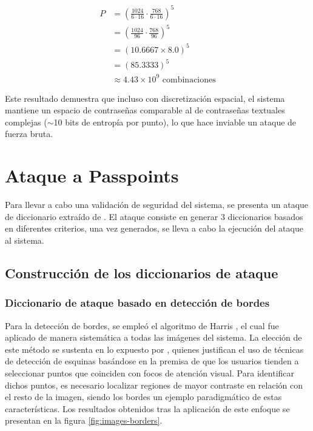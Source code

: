 \begin{align*}
	P &= \left( \frac{1024}{6 \cdot 16} \cdot \frac{768}{6 \cdot 16} \right)^5 \\
	&= \left( \frac{1024}{96} \cdot \frac{768}{96} \right)^5 \\
	&= (10.6667 \times 8.0)^5 \\
	&= (85.3333)^5 \\
	&\approx 4.43 \times 10^9 \text{ combinaciones}
\end{align*}

Este resultado demuestra que incluso con discretización espacial, el sistema mantiene un espacio de contraseñas comparable al de contraseñas textuales complejas ($\sim$10 bits de entropía por punto), lo que hace inviable un ataque de fuerza bruta.


\section{Ataque a Passpoints}
Para llevar a cabo una validaci\'on de seguridad del sistema, se presenta un ataque de diccionario extra\'ido de \cite{van2010purely}. El ataque consiste en generar 3 diccionarios basados en diferentes criterios, una vez generados, se lleva a cabo la ejecuci\'on del ataque al sistema.
\subsection{Construcci\'on de los diccionarios de ataque}
\subsubsection{Diccionario de ataque basado en detecci\'on de bordes}
Para la detección de bordes, se empleó el algoritmo de Harris \cite{Harris1988ACC}, el cual fue aplicado de manera sistemática a todas las imágenes del sistema. La elección de este método se sustenta en lo expuesto por \cite{van2010purely}, quienes justifican el uso de técnicas de detección de esquinas basándose en la premisa de que los usuarios tienden a seleccionar puntos que coinciden con focos de atención visual. Para identificar dichos puntos, es necesario localizar regiones de mayor contraste en relación con el resto de la imagen, siendo los bordes un ejemplo paradigmático de estas características. Los resultados obtenidos tras la aplicación de este enfoque se presentan en la figura \ref{fig:images-borders}.

